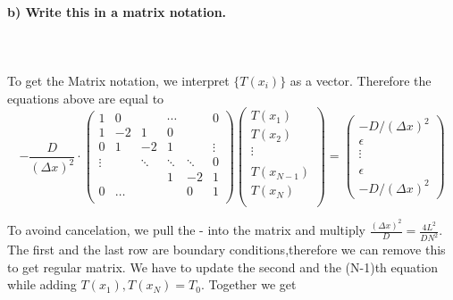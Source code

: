 \paragraph{
    b) Write this in a matrix notation.
} \ \\
    \\
    To get the Matrix notation, we interpret $\{T(x_i)\}$ as a vector. Therefore the equations above are equal to
    \begin{equation}
    -\frac{D}{(\Delta x)^2} \cdot 
    \begin{pmatrix}
    1     & 0     &        &\cdots &       & 0 \\
    1     &-2     & 1      & 0     &       &   \\
    0     & 1     & -2     & 1     &       &\vdots \\
    \vdots&       &\ddots & \ddots & \ddots&  0\\
          &       &        &    1  &  -2   & 1 \\
    0     & \dots &        &       &   0   &1    \\
    \end{pmatrix}
    \begin{pmatrix}
    T(x_1) \\
    T(x_2)\\
    \vdots \\
    \\
    T(x_{N-1})\\
    T(x_N) \\
    \end{pmatrix}
     = 
     \begin{pmatrix}
     -D/(\Delta x)^2 \\
     \epsilon \\
     \vdots \\
     \\
     \epsilon \\
     -D/(\Delta x)^2
     \end{pmatrix}
    \end{equation}
    
    To avoind cancelation, we pull the - into the matrix and multiply $ \frac{(\Delta x)^2}{D} = \frac{4 L^2}{D N^2}$. The first and the last row are boundary conditions,therefore we can remove this to get regular matrix. We have to update the second and the (N-1)th equation while adding $T(x_1), T(x_N) = T_0$. Together we get
    
